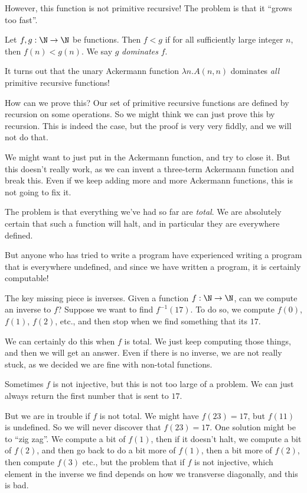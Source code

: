 \documentclass[a4paper]{article}
\begin{document}
However, this function is not primitive recursive! The problem is that it ``grows too fast''.
\begin{defi}\index{$<$}
  Let $f, g: \N \to \N$ be functions. Then $f < g$ if for all sufficiently large integer $n$, then $f(n) < g(n)$. We say $g$ \emph{dominates} $f$.
\end{defi}
It turns out that the unary Ackermann function $\lambda n. A(n, n)$ dominates \emph{all} primitive recursive functions!

How can we prove this? Our set of primitive recursive functions are defined by recursion on some operations. So we might think we can just prove this by recursion. This is indeed the case, but the proof is very very fiddly, and we will not do that.

We might want to just put in the Ackermann function, and try to close it. But this doesn't really work, as we can invent a three-term Ackermann function and break this. Even if we keep adding more and more Ackermann functions, this is not going to fix it.

The problem is that everything we've had so far are \emph{total}. We are absolutely certain that such a function will halt, and in particular they are everywhere defined.

But anyone who has tried to write a program have experienced writing a program that is everywhere undefined, and since we have written a program, it is certainly computable!

The key missing piece is inverses. Given a function $f: \N \to \N$, can we compute an inverse to $f$? Suppose we want to find $f^{-1}(17)$. To do so, we compute $f(0)$, $f(1)$, $f(2)$, etc., and then stop when we find something that its $17$.

We can certainly do this when $f$ is total. We just keep computing those things, and then we will get an answer. Even if there is no inverse, we are not really stuck, as we decided we are fine with non-total functions.

Sometimes $f$ is not injective, but this is not too large of a problem. We can just always return the first number that is sent to $17$.

But we are in trouble if $f$ is not total. We might have $f(23) = 17$, but $f(11)$ is undefined. So we will never discover that $f(23) = 17$. One solution might be to ``zig zag''. We compute a bit of $f(1)$, then if it doesn't halt, we compute a bit of $f(2)$, and then go back to do a bit more of $f(1)$, then a bit more of $f(2)$, then compute $f(3)$ etc., but the problem that if $f$ is not injective, which element in the inverse we find depends on how we transverse diagonally, and this is bad.
\end{document}
